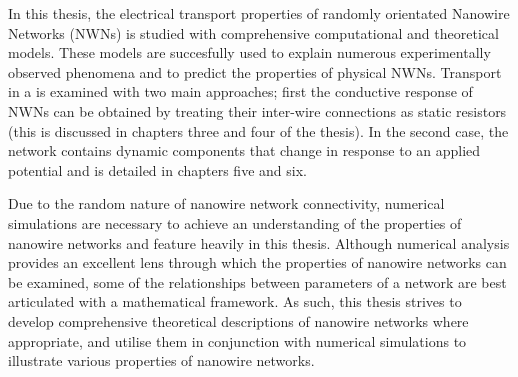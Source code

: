 In this thesis, the electrical transport properties of randomly orientated Nanowire Networks (NWNs) is studied with comprehensive computational and theoretical models. These models are succesfully used to explain numerous experimentally observed phenomena and to predict the properties of physical NWNs. Transport in a is examined with two main approaches; first the conductive response of NWNs can be obtained by treating their inter-wire connections as static resistors (this is discussed in chapters three and four of the thesis). In the second case, the network contains dynamic components that change in response to an applied potential and is detailed in chapters five and six.

Due to the random nature of nanowire network connectivity, numerical simulations are necessary to achieve an understanding of the properties of nanowire networks and feature heavily in this thesis. Although numerical analysis provides an excellent lens through which the properties of nanowire networks can be examined, some of the relationships between parameters of a network are best articulated with a mathematical framework. As such, this thesis strives to develop comprehensive theoretical descriptions of nanowire networks where appropriate, and utilise them in conjunction with numerical simulations to illustrate various properties of nanowire networks. 

